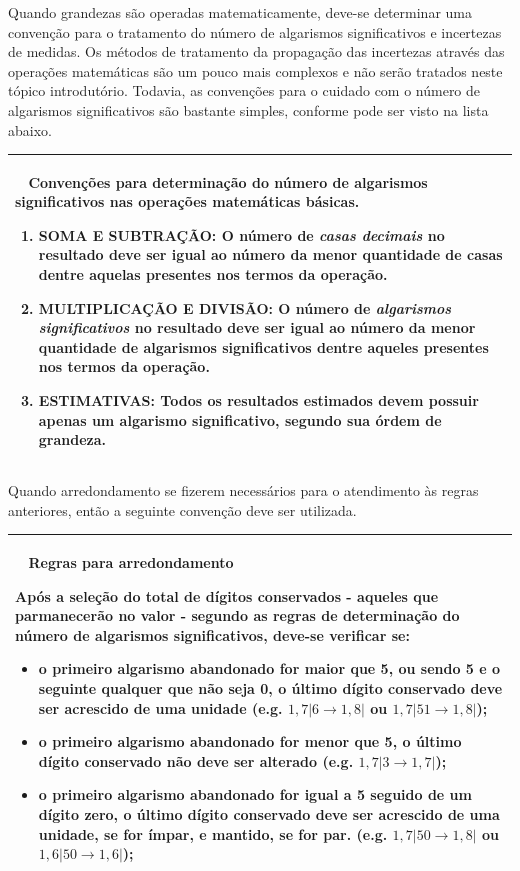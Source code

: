 \documentclass[a4paper, 11pt]{report}
\newenvironment{myboxed}
    {
        \begin{center}
        \begin{tabular}{p{0.7\textwidth}}
        \hline\
    }
    { 
        \\\hline
        \end{tabular} 
        \end{center}
    }
\begin{document}
Quando grandezas são operadas matematicamente, deve-se determinar uma convenção 
para o tratamento do número de algarismos significativos e incertezas de 
medidas. Os métodos de tratamento da propagação das incertezas através das 
operações matemáticas são um pouco mais complexos e não serão tratados neste 
tópico introdutório. Todavia, as convenções para o cuidado com o número de 
algarismos significativos são bastante simples, conforme pode ser visto na lista
abaixo.

\begin{myboxed}
    \textbf{Convenções para determinação do número de algarismos significativos 
    nas operações matemáticas básicas.}

    \begin{enumerate}
        \item \textbf{SOMA E SUBTRAÇÃO:} O número de \emph{casas decimais} no 
        resultado deve ser igual ao número da menor quantidade de casas dentre 
        aquelas presentes nos termos da operação.
        \item \textbf{MULTIPLICAÇÃO E DIVISÃO:} O número de \emph{algarismos 
        significativos} no resultado deve ser igual ao número da menor 
        quantidade de algarismos significativos dentre aqueles presentes nos 
        termos da operação.
        \item \textbf{ESTIMATIVAS:} Todos os resultados estimados devem possuir
        apenas um algarismo significativo, segundo sua órdem de grandeza. 
    \end{enumerate}
\end{myboxed}

Quando arredondamento se fizerem necessários para o atendimento às regras 
anteriores, então a seguinte convenção deve ser utilizada.

\begin{myboxed}
    \textbf{Regras para arredondamento}

    Após a seleção do total de dígitos conservados - aqueles que parmanecerão no 
    valor - segundo as regras de determinação do número de algarismos 
    significativos, deve-se verificar se:

    \begin{itemize}
        \item o primeiro algarismo abandonado for maior que 5, ou sendo 5 e 
        o seguinte qualquer que não seja 0, o último 
        dígito conservado deve ser acrescido de uma unidade  
        (e.g. $1,7|6 \rightarrow 1,8| $ ou $1,7|51 \rightarrow 1,8| $); 
        \item o primeiro algarismo abandonado for menor que 5, o último 
        dígito conservado não deve ser alterado 
        (e.g. $1,7|3 \rightarrow 1,7| $);
        \item  o primeiro algarismo abandonado for igual a 5 seguido de um 
        dígito zero, o último dígito conservado deve ser acrescido 
        de uma unidade, se for ímpar, e mantido, se for par.
        (e.g. $ 1,7|50 \rightarrow 1,8| $ ou $ 1,6|50 \rightarrow 1,6| $); 
    \end{itemize}
\end{myboxed}
\end{document}
